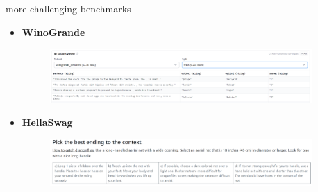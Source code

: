 \begin{vbframe}{more challenging benchmarks}

\vfill

\begin{itemize}
	\item \href{https://winogrande.allenai.org/}{\textbf{WinoGrande}}
	\begin{figure}
		\centering
		\includegraphics[width = 10cm]{figure/winogrande.png}\\ 
	\end{figure}
	\item \textbf{HellaSwag} 
	\begin{figure}
		\centering
		\includegraphics[width = 10cm]{figure/hellaswag.png}\\ 
	\end{figure}
\end{itemize}

\vfill

\end{vbframe}


